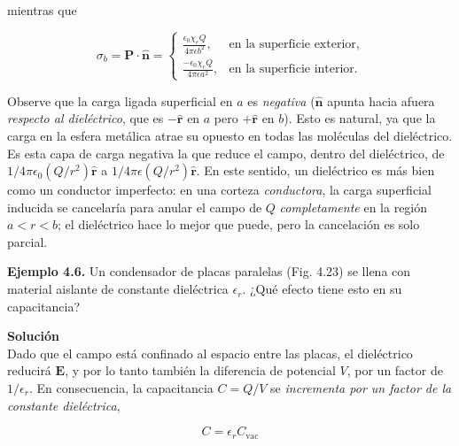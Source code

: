 \documentclass[12pt,a4paper]{report}
\newcommand{\esp}{\vspace{0.5cm}}
\begin{document}
	\esp
	
	\noindent mientras que
	
	\esp
	
	\begin{equation*}
		\sigma_b = \mathbf{P} \cdot \hat{\mathbf{n}} = \begin{cases} \frac{\epsilon_0 \chi_e Q}{4\pi \epsilon b^2}, & \text{en la superficie exterior,} \\ \frac{-\epsilon_0 \chi_e Q}{4\pi \epsilon a^2}, & \text{en la superficie interior.} \end{cases}
	\end{equation*}
	
	\esp
	
	Observe que la carga ligada superficial en $a$ es \textit{negativa} ($\hat{\mathbf{n}}$ apunta hacia afuera \textit{respecto al dieléctrico}, que es $-\hat{\mathbf{r}}$ en $a$ pero $+\hat{\mathbf{r}}$ en $b$). Esto es natural, ya que la carga en la esfera metálica atrae su opuesto en todas las moléculas del dieléctrico. Es esta capa de carga negativa la que reduce el campo, dentro del dieléctrico, de $1/4\pi\epsilon_0 (Q/r^2) \hat{\mathbf{r}}$ a $1/4\pi\epsilon (Q/r^2) \hat{\mathbf{r}}$. En este sentido, un dieléctrico es más bien como un conductor imperfecto: en una corteza \textit{conductora}, la carga superficial inducida se cancelaría para anular el campo de $Q$ \textit{completamente} en la región $a < r < b$; el dieléctrico hace lo mejor que puede, pero la cancelación es solo parcial.
	
	\esp
	
	\noindent \textbf{Ejemplo 4.6.} Un condensador de placas paralelas (Fig. 4.23) se llena con material aislante de constante dieléctrica $\epsilon_r$. ¿Qué efecto tiene esto en su capacitancia?
	
	\esp
	
	\noindent \textbf{Solución} \\
	Dado que el campo está confinado al espacio entre las placas, el dieléctrico reducirá $\mathbf{E}$, y por lo tanto también la diferencia de potencial $V$, por un factor de $1/\epsilon_r$. En consecuencia, la capacitancia $C = Q/V$ se \textit{incrementa por un factor de la constante dieléctrica},
	
	\esp
	
	\begin{equation}
		C = \epsilon_r C_{\text{vac}} \tag{4.37}
	\end{equation}
	
	\esp
	
\end{document}
